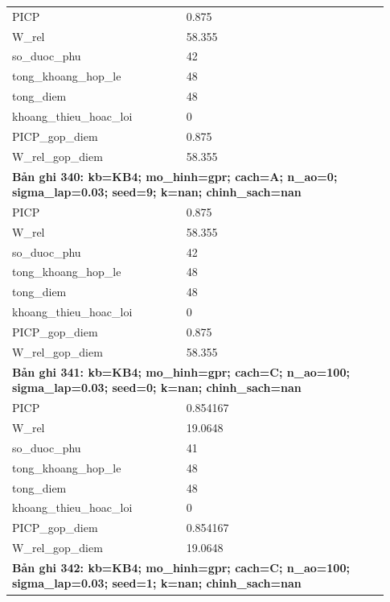 \begin{longtable}{p{0.43\linewidth}p{0.50\linewidth}}
PICP & 0.875 \\
W\_\allowbreak rel & 58.355 \\
so\_\allowbreak duoc\_\allowbreak phu & 42 \\
tong\_\allowbreak khoang\_\allowbreak hop\_\allowbreak le & 48 \\
tong\_\allowbreak diem & 48 \\
khoang\_\allowbreak thieu\_\allowbreak hoac\_\allowbreak loi & 0 \\
PICP\_\allowbreak gop\_\allowbreak diem & 0.875 \\
W\_\allowbreak rel\_\allowbreak gop\_\allowbreak diem & 58.355 \\
\midrule
\multicolumn{2}{p{0.95\linewidth}}{\textbf{Bản ghi 340: kb=KB4; mo\_hinh=gpr; cach=A; n\_ao=0; sigma\_lap=0.03; seed=9; k=nan; chinh\_sach=nan}} \\
PICP & 0.875 \\
W\_\allowbreak rel & 58.355 \\
so\_\allowbreak duoc\_\allowbreak phu & 42 \\
tong\_\allowbreak khoang\_\allowbreak hop\_\allowbreak le & 48 \\
tong\_\allowbreak diem & 48 \\
khoang\_\allowbreak thieu\_\allowbreak hoac\_\allowbreak loi & 0 \\
PICP\_\allowbreak gop\_\allowbreak diem & 0.875 \\
W\_\allowbreak rel\_\allowbreak gop\_\allowbreak diem & 58.355 \\
\midrule
\multicolumn{2}{p{0.95\linewidth}}{\textbf{Bản ghi 341: kb=KB4; mo\_hinh=gpr; cach=C; n\_ao=100; sigma\_lap=0.03; seed=0; k=nan; chinh\_sach=nan}} \\
PICP & 0.854167 \\
W\_\allowbreak rel & 19.0648 \\
so\_\allowbreak duoc\_\allowbreak phu & 41 \\
tong\_\allowbreak khoang\_\allowbreak hop\_\allowbreak le & 48 \\
tong\_\allowbreak diem & 48 \\
khoang\_\allowbreak thieu\_\allowbreak hoac\_\allowbreak loi & 0 \\
PICP\_\allowbreak gop\_\allowbreak diem & 0.854167 \\
W\_\allowbreak rel\_\allowbreak gop\_\allowbreak diem & 19.0648 \\
\midrule
\multicolumn{2}{p{0.95\linewidth}}{\textbf{Bản ghi 342: kb=KB4; mo\_hinh=gpr; cach=C; n\_ao=100; sigma\_lap=0.03; seed=1; k=nan; chinh\_sach=nan}} \\

\end{longtable}
